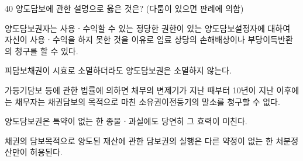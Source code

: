 \begin{question}{40}
양도담보에 관한 설명으로 옳은 것은? (다툼이 있으면 판례에 의함)
\begin{choices}
  \item 양도담보권자는 사용ㆍ수익할 수 있는 정당한 권한이 있는 양도담보설정자에 대하여 자신이 사용ㆍ수익을 하지 못한 것을 이유로 임료 상당의 손해배상이나 부당이득반환의 청구를 할 수 있다.
  \item 피담보채권이 시효로 소멸하더라도 양도담보권은 소멸하지 않는다.
  \item 가등기담보 등에 관한 법률에 의하면 채무의 변제기가 지난 때부터 10년이 지난 이후에는 채무자는 채권담보의 목적으로 마친 소유권이전등기의 말소를 청구할 수 없다.
  \item 양도담보권은 특약이 없는 한 종물ㆍ과실에도 당연히 그 효력이 미친다.
  \item 채권의 담보목적으로 양도된 재산에 관한 담보권의 실행은 다른 약정이 없는 한 처분정산만이 허용된다.
\end{choices}
\end{question}
